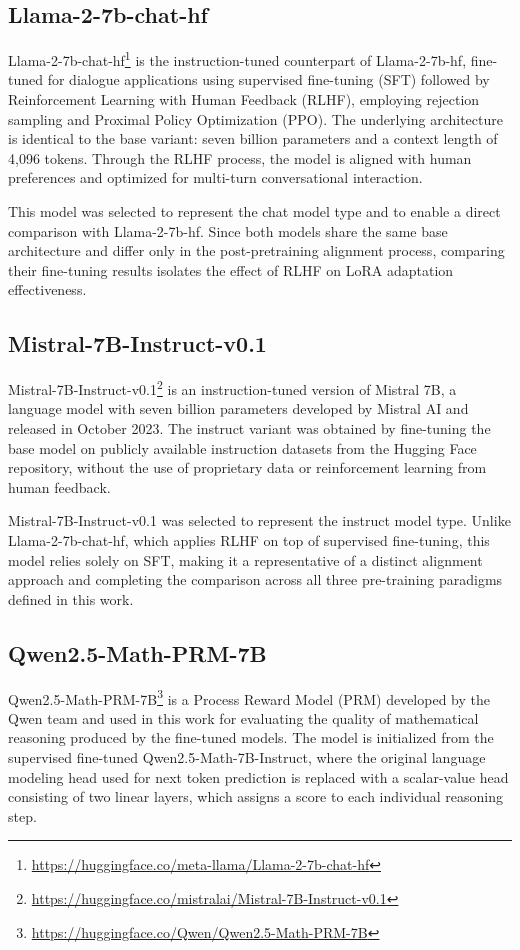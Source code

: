   \subsection*{Llama-2-7b-chat-hf}
  Llama-2-7b-chat-hf\footnote{\url{https://huggingface.co/meta-llama/Llama-2-7b-chat-hf}}
  \cite{touvron2023} is the instruction-tuned counterpart of
  Llama-2-7b-hf, fine-tuned for dialogue applications using
  supervised fine-tuning (SFT) followed by Reinforcement Learning
  with Human Feedback (RLHF), employing rejection sampling and Proximal Policy
  Optimization (PPO). The
  underlying architecture is identical to the base variant: seven
  billion parameters and a context length of 4,096 tokens. Through
  the RLHF process, the model is aligned with human preferences
  and optimized for multi-turn conversational interaction.

This model was selected to represent the chat model type and to enable a direct comparison
  with Llama-2-7b-hf. Since both models share the same base
  architecture and differ only in the post-pretraining alignment
  process, comparing their fine-tuning results isolates the effect
  of RLHF on LoRA adaptation effectiveness.

\subsection*{Mistral-7B-Instruct-v0.1}
Mistral-7B-Instruct-v0.1\footnote{\url{https://huggingface.co/mistralai/Mistral-7B-Instruct-v0.1}}
\cite{jiang2023} is an instruction-tuned version of
  Mistral 7B, a language model with seven billion parameters developed
  by Mistral AI and released in October 2023. The
  instruct variant was obtained by fine-tuning the base model on
  publicly available instruction datasets from the Hugging Face
  repository, without the use of proprietary data or reinforcement
  learning from human feedback.

  Mistral-7B-Instruct-v0.1 was selected to represent the instruct
  model type. Unlike
  Llama-2-7b-chat-hf, which applies RLHF on top of supervised
  fine-tuning, this model relies solely on SFT, making it a
  representative of a distinct alignment approach and completing
  the comparison across all three pre-training paradigms defined
  in this work.


\subsection*{Qwen2.5-Math-PRM-7B}
Qwen2.5-Math-PRM-7B\footnote{\url{https://huggingface.co/Qwen/Qwen2.5-Math-PRM-7B}}
\cite{qwen2025prm} is a Process Reward Model (PRM) developed
  by the Qwen team and used in this work for evaluating the quality
  of mathematical reasoning produced by the fine-tuned models. The model is initialized
  from the supervised
  fine-tuned Qwen2.5-Math-7B-Instruct, where the original language
  modeling head used for next token prediction is replaced with a
  scalar-value head consisting of two linear layers, which assigns
  a score to each individual reasoning step.


